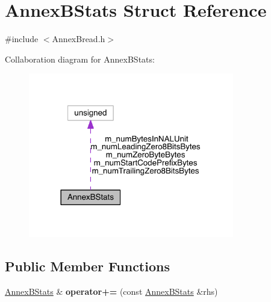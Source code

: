 \hypertarget{struct_annex_b_stats}{}\section{Annex\+B\+Stats Struct Reference}
\label{struct_annex_b_stats}


{\ttfamily \#include $<$Annex\+Bread.\+h$>$}



Collaboration diagram for Annex\+B\+Stats\+:
\nopagebreak
\begin{figure}[H]
\begin{center}
\leavevmode
\includegraphics[width=254pt]{d4/df5/struct_annex_b_stats__coll__graph}
\end{center}
\end{figure}
\subsection*{Public Member Functions}
\begin{DoxyCompactItemize}
\item 
\mbox{\label{struct_annex_b_stats_a835da7e3a6e7a9d3807ed0f44f49228e}} 
\hyperlink{struct_annex_b_stats}{Annex\+B\+Stats} \& {\bfseries operator+=} (const \hyperlink{struct_annex_b_stats}{Annex\+B\+Stats} \&rhs)
\end{DoxyCompactItemize}
